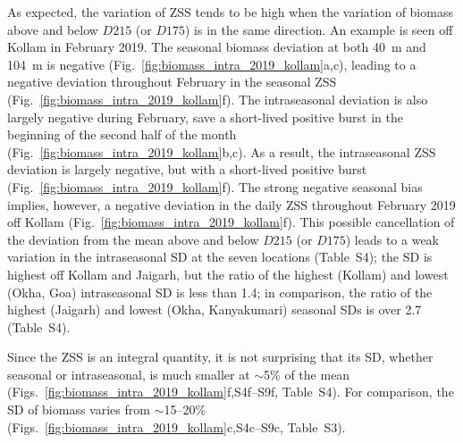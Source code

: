 \documentclass[authoryear,review,11pt]{elsarticle}
\newcommand{\chla}{chl-{\emph{a}}}
\providecommand{\DIFaddtex}[1]{{\protect\color{blue}\uwave{#1}}} %
\providecommand{\DIFaddbegin}{} %
\providecommand{\DIFaddend}{} %
\providecommand{\DIFadd}[1]{\texorpdfstring{\DIFaddtex{#1}}{#1}} %
\begin{document}
As expected, the variation of ZSS tends to be high when the variation of biomass above and below $D215$ (or $D175$) is in the same direction. An example is seen off Kollam in February 2019.  The seasonal biomass deviation at both 40~m and 104~m is negative (Fig.~\ref{fig:biomass_intra_2019_kollam}a,c), leading to a negative deviation throughout February in the seasonal ZSS (Fig.~\ref{fig:biomass_intra_2019_kollam}f).  The intraseasonal deviation is also largely negative during February, save a short-lived positive burst in the beginning of the second half of the month (Fig.~\ref{fig:biomass_intra_2019_kollam}b,c).  As a result, the intraseasonal ZSS deviation is largely negative, but with a short-lived positive burst (Fig.~\ref{fig:biomass_intra_2019_kollam}f). The strong negative seasonal bias implies, however, a negative deviation in the daily ZSS throughout February 2019 off Kollam (Fig.~\ref{fig:biomass_intra_2019_kollam}f).  This possible cancellation of the deviation from the mean above and below $D215$ (or $D175$) leads to a weak variation in the intraseasonal SD \DIFaddbegin \DIFadd{of ZSS }\DIFaddend at the seven locations (Table~S4); the SD is highest off Kollam and Jaigarh, but the ratio of the highest (Kollam) and lowest (Okha, Goa) intraseasonal SD is less than 1.4; in comparison, the ratio of the highest (Jaigarh) and lowest (Okha, Kanyakumari) seasonal SDs is over 2.7 (Table~S4).

Since the ZSS is an integral quantity, it is not surprising that its SD, whether seasonal or intraseasonal, is much smaller at $\sim$5\% of the mean (Figs.~\ref{fig:biomass_intra_2019_kollam}f,S4f--S9f, Table~S4). For comparison, the SD of biomass varies from $\sim$15--20\% (Figs.~\ref{fig:biomass_intra_2019_kollam}c,S4c--S9c, Table~S3).





\end{document}
